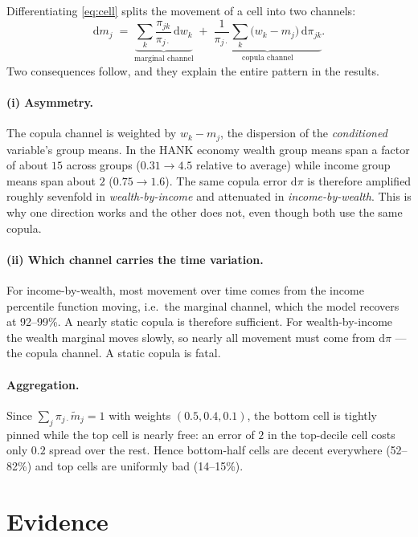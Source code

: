 \documentclass[11pt]{article}
\begin{document}
Differentiating \eqref{eq:cell} splits the movement of a cell into two channels:
\begin{equation}
  \mathrm{d} m_j \;=\;
  \underbrace{\sum_k \frac{\pi_{jk}}{\pi_{j\cdot}}\, \mathrm{d}w_k}_{\text{marginal channel}}
  \;+\;
  \underbrace{\frac{1}{\pi_{j\cdot}}\sum_k \bigl( w_k - m_j \bigr)\, \mathrm{d}\pi_{jk}}_{\text{copula channel}} .
  \label{eq:decomp}
\end{equation}
Two consequences follow, and they explain the entire pattern in the results.

\paragraph{(i) Asymmetry.} The copula channel is weighted by $w_k - m_j$, the
dispersion of the \emph{conditioned} variable's group means. In the HANK economy
wealth group means span a factor of about $15$ across groups
($0.31 \to 4.5$ relative to average) while income group means span about $2$
($0.75 \to 1.6$). The same copula error $\mathrm{d}\pi$ is therefore amplified
roughly sevenfold in \emph{wealth-by-income} and attenuated in
\emph{income-by-wealth}. This is why one direction works and the other does not,
even though both use the same copula.

\paragraph{(ii) Which channel carries the time variation.} For
income-by-wealth, most movement over time comes from the income percentile
function moving, i.e.\ the marginal channel, which the model recovers at
92--99\%. A nearly static copula is therefore sufficient. For
wealth-by-income the wealth marginal moves slowly, so nearly all movement must
come from $\mathrm{d}\pi$ --- the copula channel. A static copula is fatal.

\paragraph{Aggregation.} Since $\sum_j \pi_{j\cdot} \tilde m_j = 1$ with weights
$(0.5, 0.4, 0.1)$, the bottom cell is tightly pinned while the top cell is
nearly free: an error of $2$ in the top-decile cell costs only $0.2$ spread over
the rest. Hence bottom-half cells are decent everywhere (52--82\%) and top cells
are uniformly bad (14--15\%).

\section{Evidence}\label{sec:evidence}
\end{document}
